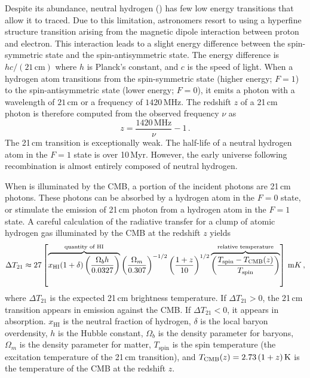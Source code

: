 \begin{bibunit}
Despite its abundance, neutral hydrogen () has few low energy transitions that allow it to
traced.  Due to this limitation, astronomers resort to using a hyperfine structure transition
arising from the magnetic dipole interaction between proton and electron. This interaction leads to
a slight energy difference between the spin-symmetric state and the spin-antisymmetric state. The
energy difference is $hc / (21\,\text{cm})$ where $h$ is Planck's constant, and $c$ is the speed of
light.  When a hydrogen atom transitions from the spin-symmetric state (higher energy; $F=1$) to the
spin-antisymmetric state (lower energy; $F=0$), it emits a photon with a wavelength of
$21\,\text{cm}$ or a frequency of $1420\,\text{MHz}$. The redshift $z$ of a 21\,cm photon is
therefore computed from the observed frequency $\nu$ as
\begin{equation}\label{eq:redshift-equation}
    z = \frac{1420\,\text{MHz}}{\nu} - 1\,.
\end{equation}
The 21\,cm transition is exceptionally weak.  The half-life of a neutral hydrogen atom in the $F=1$
state is over 10\,Myr.  However, the early universe following recombination is almost entirely
composed of neutral hydrogen.

When  is illuminated by the CMB, a portion of the incident photons are 21\,cm photons.
These photons can be absorbed by a hydrogen atom in the $F=0$ state, or stimulate the emission of
21\,cm photon from a hydrogen atom in the $F=1$ state.  A careful calculation of the radiative
transfer for a clump of atomic hydrogen gas illuminated by the CMB at the redshift $z$ yields
\citep[][but neglecting the contribution of peculiar velocities]{2012RPPh...75h6901P}
\begin{equation}\label{eq:radiative-transfer-equation}
    \Delta T_{21} \approx 27 \left[
        \overbrace{
            x_\text{HI} (1+\delta)
            \left(\frac{\Omega_b h}{0.0327}\right)
        }^{\text{quantity of HI}}
        \left(\frac{\Omega_m}{0.307}\right)^{-1/2}
        \left(\frac{1+z}{10}\right)^{1/2}
        \overbrace{
            \left(\frac{T_\text{spin} - T_\text{CMB}(z)}{T_\text{spin}}\right)
        }^{\text{relative temperature}}
    \right] \, {\rm mK} \,,
\end{equation}
where $\Delta T_{21}$ is the expected 21\,cm brightness temperature. If $\Delta T_{21} > 0$, the
21\,cm transition appears in emission against the CMB. If $\Delta T_{21} < 0$, it appears in
absorption. $x_\text{HI}$ is the neutral fraction of hydrogen, $\delta$ is the local baryon
overdensity, $h$ is the Hubble constant, $\Omega_b$ is the density parameter for baryons, $\Omega_m$
is the density parameter for matter, $T_\text{spin}$ is the spin temperature (the excitation
temperature of the 21\,cm transition), and $T_\text{CMB}(z) = 2.73\,(1+z)\,{\rm K}$ is the
temperature of the CMB at the redshift $z$.


\end{bibunit}
